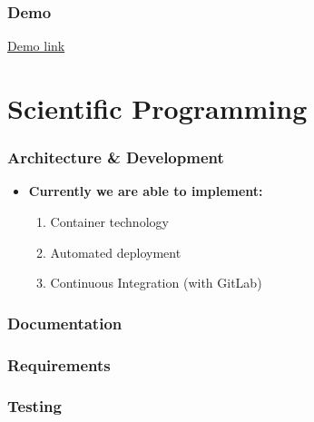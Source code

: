 \documentclass[12pt]{beamer}
\begin{document}
    \begin{frame}
        \frametitle{Demo}
        \href{http://dev-jiskefet.westeurope.cloudapp.azure.com/}{Demo link}
    \end{frame}

    \section{Scientific Programming}
    \begin{frame}
        \frametitle{Architecture \& Development}
        \begin{itemize}
            \item<1->\textbf{Currently we are able to implement:}
            \begin{enumerate}    
                \item<2-> Container technology
                \item<3-> Automated deployment
                \item<4-> Continuous Integration (with GitLab)
            \end{enumerate}
        \end{itemize}
    \end{frame}

    \begin{frame}
        \frametitle{Documentation}
    \end{frame}

    \begin{frame}
        \frametitle{Requirements}
    \end{frame}

    \begin{frame}
        \frametitle{Testing}
    \end{frame}
\end{document}
